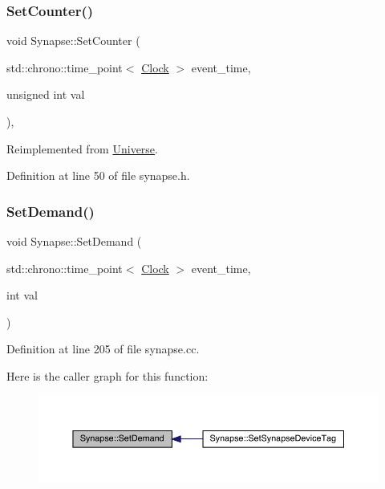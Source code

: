 \mbox{\label{class_synapse_aa1a990a7b89fbeaf1109a8b70d86111b}} 
\subsubsection{\texorpdfstring{Set\+Counter()}{SetCounter()}}
{\footnotesize\ttfamily void Synapse\+::\+Set\+Counter (\begin{DoxyParamCaption}\item[{std\+::chrono\+::time\+\_\+point$<$ \hyperlink{universe_8h_a0ef8d951d1ca5ab3cfaf7ab4c7a6fd80}{Clock} $>$}]{event\+\_\+time,  }\item[{unsigned int}]{val }\end{DoxyParamCaption})\hspace{0.3cm}{\ttfamily [inline]}, {\ttfamily [virtual]}}



Reimplemented from \hyperlink{class_universe_aa22202ae740eb1355529afcb13285e91}{Universe}.



Definition at line 50 of file synapse.\+h.

\mbox{\label{class_synapse_a1a6e54f679223615065572502df5e257}} 
\subsubsection{\texorpdfstring{Set\+Demand()}{SetDemand()}}
{\footnotesize\ttfamily void Synapse\+::\+Set\+Demand (\begin{DoxyParamCaption}\item[{std\+::chrono\+::time\+\_\+point$<$ \hyperlink{universe_8h_a0ef8d951d1ca5ab3cfaf7ab4c7a6fd80}{Clock} $>$}]{event\+\_\+time,  }\item[{int}]{val }\end{DoxyParamCaption})}



Definition at line 205 of file synapse.\+cc.

Here is the caller graph for this function\+:\nopagebreak
\begin{figure}[H]
\begin{center}
\leavevmode
\includegraphics[width=350pt]{class_synapse_a1a6e54f679223615065572502df5e257_icgraph}
\end{center}
\end{figure}
\mbox{\label{class_synapse_a1956d553c15fa1aea12d39725baeca1b}} 
